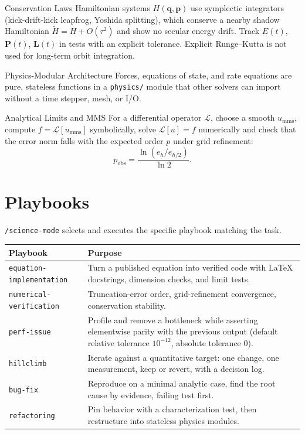 \documentclass[11pt,a4paper]{report}
\begin{document}
\begin{principlebox}{Conservation Laws}
Hamiltonian systems $H(\mathbf{q},\mathbf{p})$ use symplectic integrators (kick-drift-kick leapfrog, Yoshida splitting), which conserve a nearby shadow Hamiltonian $\widetilde H = H + O(\tau^2)$ and show no secular energy drift. Track $E(t)$, $\mathbf{P}(t)$, $\mathbf{L}(t)$ in tests with an explicit tolerance. Explicit Runge--Kutta is not used for long-term orbit integration.
\end{principlebox}

\begin{principlebox}{Physics-Modular Architecture}
Forces, equations of state, and rate equations are pure, stateless functions in a \texttt{physics/} module that other solvers can import without a time stepper, mesh, or I/O.
\end{principlebox}

\begin{principlebox}{Analytical Limits and MMS}
For a differential operator $\mathcal{L}$, choose a smooth $u_{\mathrm{mms}}$, compute $f=\mathcal{L}[u_{\mathrm{mms}}]$ symbolically, solve $\mathcal{L}[u]=f$ numerically and check that the error norm falls with the expected order $p$ under grid refinement:
\[ p_{\mathrm{obs}} = \frac{\ln(e_h/e_{h/2})}{\ln 2}. \]
\end{principlebox}

\chapter{Playbooks}
\texttt{/science-mode} selects and executes the specific playbook matching the task.
\begin{table}[h]
\centering
\small
\begin{tabular}{lp{10cm}}
\toprule
\textbf{Playbook} & \textbf{Purpose} \\
\midrule
\texttt{equation-implementation} & Turn a published equation into verified code with LaTeX docstrings, dimension checks, and limit tests. \\
\texttt{numerical-verification} & Truncation-error order, grid-refinement convergence, conservation stability. \\
\texttt{perf-issue} & Profile and remove a bottleneck while asserting elementwise parity with the previous output (default relative tolerance $10^{-12}$, absolute tolerance 0). \\
\texttt{hillclimb} & Iterate against a quantitative target: one change, one measurement, keep or revert, with a decision log. \\
\texttt{bug-fix} & Reproduce on a minimal analytic case, find the root cause by evidence, failing test first. \\
\texttt{refactoring} & Pin behavior with a characterization test, then restructure into stateless physics modules. \\
\bottomrule
\end{tabular}
\end{table}
\end{document}
